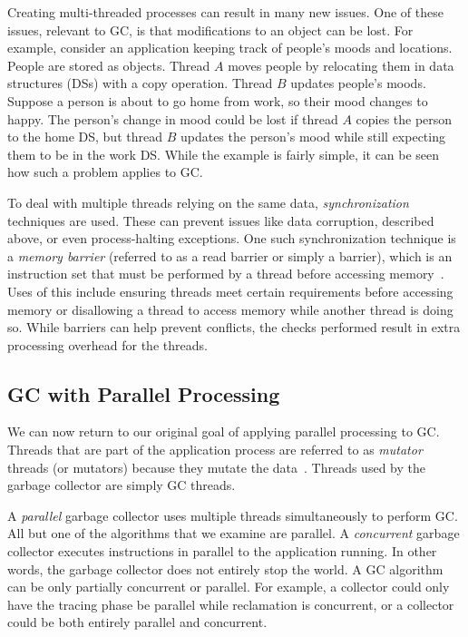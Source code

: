 \documentclass{sig-alternate}
\begin{document}
Creating multi-threaded processes can result in many new issues.
One of these issues, relevant to GC, is that modifications to an 
object can be lost. For example, consider an application keeping 
track of people's moods and locations. People are stored as objects.
Thread $A$ moves people by relocating them in data structures (DSs) 
with a copy operation. Thread $B$ updates people's moods. Suppose a person
is about to go home from work, so their mood changes to happy.
The person's change in mood could be lost if thread $A$ copies the person
to the home DS, but thread $B$ updates the person's mood while still expecting
them to be in the work DS. 
While the example is fairly simple, it can be seen how such a problem
applies to GC.

To deal with multiple threads relying on the same data, \emph{synchronization}
techniques are used. These can prevent issues 
like data corruption, described above, or even process-halting exceptions. 
One such synchronization technique is a \emph{memory barrier} (referred to 
as a read barrier or simply a barrier), which is an instruction set
that must be performed by a thread
before accessing memory~\cite{wiki:barrier}. Uses of this include ensuring threads
meet certain requirements before accessing memory or disallowing a thread to
access memory while another thread is doing so. While barriers can help prevent 
conflicts, the checks performed result in extra processing overhead for the threads.


\subsection{GC with Parallel Processing}
\label{sec:parallelProcessingGarbageCollection}

We can now return to our original goal of applying parallel processing to GC.
Threads that are part of the application process are referred to as \emph{mutator}
threads (or mutators) because they mutate the data~\cite{Tene:C4,Iyengar:Collie,Osterlund:FPP}. 
Threads used by the garbage collector are simply GC threads.

A \emph{parallel} garbage collector uses
multiple threads simultaneously to perform GC.~\cite{Puffitsch:background}
All but one of the algorithms that we examine are parallel. A \emph{concurrent} garbage
collector executes instructions in parallel to the application running. In other 
words, the garbage collector does not entirely stop the world. A GC algorithm
can be only partially concurrent or parallel. For example, a collector could
only have the tracing phase be parallel while reclamation is concurrent, or 
a collector could be both entirely parallel and concurrent.
\end{document}
